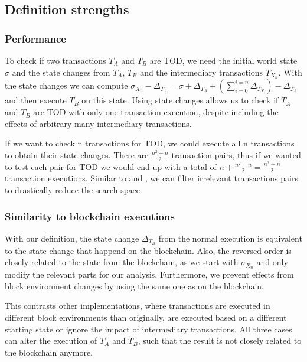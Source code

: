 \documentclass[draft,final]{vutinfth} %
\begin{document}
\subsection{Definition strengths}

\subsubsection{Performance}

To check if two transactions $T_A$ and $T_B$ are TOD, we need the initial world state $\sigma$ and the state changes from $T_A$, $T_B$ and the intermediary transactions $T_{X_n}$. With the state changes we can compute $\sigma_{X_n} - \Delta_{T_A} = \sigma + \Delta_{T_A} + (\sum_{i=0}^{i=n} \Delta_{T_{X_i}}) - \Delta_{T_A}$ and then execute $T_B$ on this state. Using state changes allows us to check if $T_A$ and $T_B$ are TOD with only one transaction execution, despite including the effects of arbitrary many intermediary transactions.

If we want to check n transactions for TOD, we could execute all n transactions to obtain their state changes. There are $\frac{n^2 - n}{2}$ transaction pairs, thus if we wanted to test each pair for TOD we would end up with a total of $n + \frac{n^2 - n}{2} = \frac{n^2 + n}{2}$ transaction executions. Similar to \cite{torres_frontrunner_2021} and \cite{zhang_combatting_2023}, we can filter irrelevant transactions pairs to drastically reduce the search space.

\subsubsection{Similarity to blockchain executions}

With our definition, the state change $\Delta_{T_B}$ from the normal execution is equivalent to the state change that happend on the blockchain. Also, the reversed order is closely related to the state from the blockchain, as we start with $\sigma_{X_n}$ and only modify the relevant parts for our analysis. Furthermore, we prevent effects from block environment changes by using the same one as on the blockchain.

This contrasts other implementations, where transactions are executed in different block environments than originally, are executed based on a different starting state or ignore the impact of intermediary transactions. All three cases can alter the execution of $T_A$ and $T_B$, such that the result is not closely related to the blockchain anymore.
\end{document}
